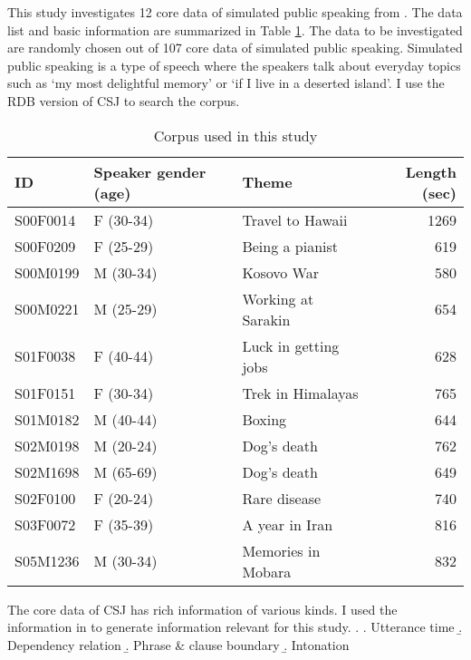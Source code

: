 This study investigates 12 core data of simulated public speaking 
from  \cite[CSJ:][]{maekawa03,maekawaetal04}.
The data list and basic information are summarized in Table \ref{CorpusInfoT}.
The data to be investigated are randomly chosen out of 107 core data of simulated public speaking.
Simulated public speaking is a type of speech
where the speakers talk about everyday topics
such as `my most delightful memory' or `if I live in a deserted island'.
I use the RDB version of CSJ \cite{koisoetal12} to search the corpus.

\begin{table}
	\begin{center}
	\caption{Corpus used in this study}
	\label{CorpusInfoT}
	\begin{tabular}{lllr}
	\toprule
	ID & Speaker gender (age) & Theme & Length (sec) \\
	\midrule
	S00F0014 & F (30-34) & Travel to Hawaii & 1269 \\
	S00F0209 & F (25-29) & Being a pianist & 619 \\
	S00M0199 & M (30-34) & Kosovo War & 580 \\
	S00M0221 & M (25-29) & Working at Sarakin & 654 \\
	S01F0038 & F (40-44) & Luck in getting jobs & 628 \\
	S01F0151 & F (30-34) & Trek in Himalayas & 765 \\
	S01M0182 & M (40-44) & Boxing & 644 \\
	S02M0198 & M (20-24) & Dog's death & 762 \\
	S02M1698 & M (65-69) & Dog's death & 649 \\
	S02F0100 & F (20-24) & Rare disease & 740 \\
	S03F0072 & F (35-39) & A year in Iran & 816 \\
	S05M1236 & M (30-34) & Memories in Mobara & 832 \\
	\bottomrule
	\end{tabular}
	\end{center}
\end{table}

The core data of CSJ has rich information of various kinds.
I used the information in \Next to generate information relevant for this study.
%
\ex.
 \a. Utterance time
 \b. Dependency relation
 \b. Phrase \& clause boundary
 \b. Intonation

